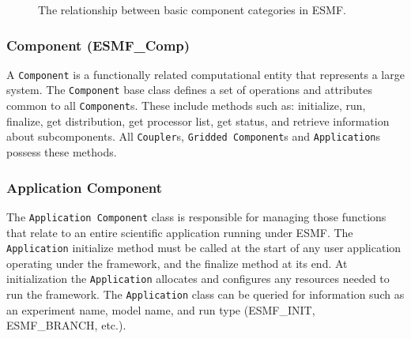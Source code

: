 \begin{figure}
\caption[{Component Classes}]{The relationship between basic component categories in ESMF.} 
\label{fig:ESMFComponentDiagram}
\end{figure}

\subsubsection{Component (ESMF\_Comp)} 
A {\tt Component} is a functionally related computational entity that 
represents a large system.  The {\tt Component} base class defines a set of operations and
attributes common to all {\tt Component}s.  These include methods such as:
initialize, run, finalize, get distribution, get processor list, get status, 
and retrieve information about subcomponents.  
All {\tt Coupler}s, {\tt Gridded Component}s and {\tt Application}s possess 
these methods. 

\subsubsection{Application Component }

The {\tt Application Component} class is responsible for managing those 
functions that relate to an entire scientific application running under ESMF.
The {\tt Application} initialize method 
must be called at the start of any user application operating under the framework, and
the finalize method at its end.  At initialization the {\tt Application} allocates and 
configures any resources needed to run the framework.  The {\tt Application}
class can be queried for information such as an experiment name, model name, and run 
type (ESMF\_INIT, ESMF\_BRANCH, etc.).  

